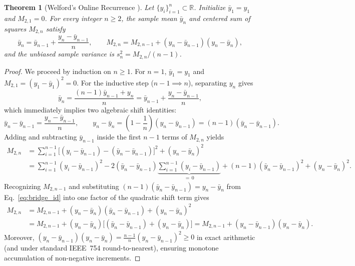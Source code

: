 \documentclass[oneside,noexaminfo,english]{sapthesis}
\numberwithin{equation}{section}
\numberwithin{figure}{section}
\numberwithin{table}{section}
\theoremstyle{compactplain}
\newtheorem{theorem}{Theorem}[section]
\theoremstyle{compactdef}
\theoremstyle{compactrem}
\newcommand{\R}{\mathbb{R}}
\begin{document}
\begin{theorem}[Welford's Online Recurrence \cite{welford1962,knuth1997}]
\label{thm:welford}
Let $\{y_i\}_{i=1}^n \subset \R$. Initialize $\bar{y}_1 = y_1$ and $M_{2,1} = 0$. For every integer $n \ge 2$, the sample mean $\bar{y}_n$ and centered sum of squares $M_{2,n}$ satisfy
\begin{equation}
    \label{eq:welford_rec}
    \bar{y}_n = \bar{y}_{n-1} + \frac{y_n - \bar{y}_{n-1}}{n}, \qquad
    M_{2,n} = M_{2,n-1} + (y_n - \bar{y}_{n-1})(y_n - \bar{y}_n),
\end{equation}
and the unbiased sample variance is $s_n^2 = M_{2,n} / (n-1)$.
\end{theorem}
\begin{proof}
We proceed by induction on $n \ge 1$. For $n=1$, $\bar{y}_1 = y_1$ and $M_{2,1} = (y_1 - \bar{y}_1)^2 = 0$. For the inductive step ($n-1 \implies n$), separating $y_n$ gives
\begin{equation}
    \label{eq:mean_step}
    \bar{y}_n = \frac{(n-1)\bar{y}_{n-1} + y_n}{n} = \bar{y}_{n-1} + \frac{y_n - \bar{y}_{n-1}}{n},
\end{equation}
which immediately implies two algebraic shift identities:
\begin{equation}
    \label{eq:bridge_id}
    \bar{y}_n - \bar{y}_{n-1} = \frac{y_n - \bar{y}_{n-1}}{n}, \qquad
    y_n - \bar{y}_n = \left(1 - \frac{1}{n}\right)(y_n - \bar{y}_{n-1}) = (n-1)(\bar{y}_n - \bar{y}_{n-1}).
\end{equation}
Adding and subtracting $\bar{y}_{n-1}$ inside the first $n-1$ terms of $M_{2,n}$ yields
\begin{align*}
    M_{2,n} &= \sum_{i=1}^{n-1} \bigl[(y_i - \bar{y}_{n-1}) - (\bar{y}_n - \bar{y}_{n-1})\bigr]^2 + (y_n - \bar{y}_n)^2 \\
    &= \sum_{i=1}^{n-1}(y_i - \bar{y}_{n-1})^2 - 2(\bar{y}_n - \bar{y}_{n-1})\underbrace{\sum_{i=1}^{n-1}(y_i - \bar{y}_{n-1})}_{=\,0} + (n-1)(\bar{y}_n - \bar{y}_{n-1})^2 + (y_n - \bar{y}_n)^2.
\end{align*}
Recognizing $M_{2,n-1}$ and substituting $(n-1)(\bar{y}_n - \bar{y}_{n-1}) = y_n - \bar{y}_n$ from Eq.~\eqref{eq:bridge_id} into one factor of the quadratic shift term gives
\begin{align*}
    M_{2,n} &= M_{2,n-1} + (y_n - \bar{y}_n)(\bar{y}_n - \bar{y}_{n-1}) + (y_n - \bar{y}_n)^2 \\
    &= M_{2,n-1} + (y_n - \bar{y}_n)\bigl[(\bar{y}_n - \bar{y}_{n-1}) + (y_n - \bar{y}_n)\bigr] = M_{2,n-1} + (y_n - \bar{y}_{n-1})(y_n - \bar{y}_n).
\end{align*}
Moreover, $(y_n - \bar{y}_{n-1})(y_n - \bar{y}_n) = \frac{n-1}{n}(y_n - \bar{y}_{n-1})^2 \ge 0$ in exact arithmetic (and under standard IEEE~754 round-to-nearest), ensuring monotone accumulation of non-negative increments.
\end{proof}
\end{document}

